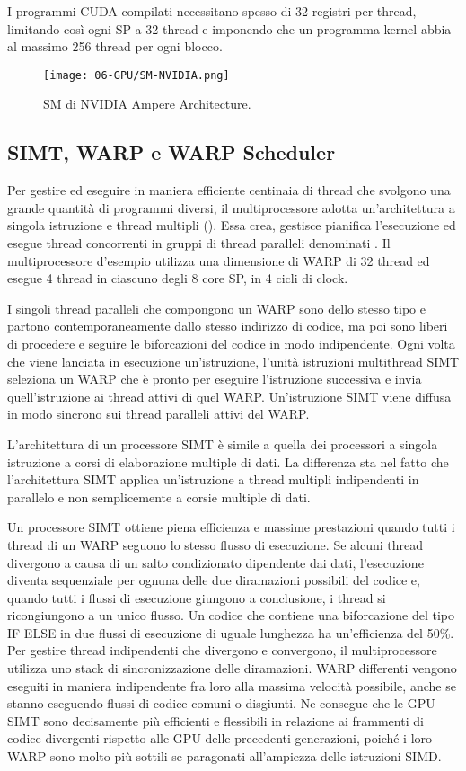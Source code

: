 I programmi CUDA compilati necessitano spesso di 32 registri per thread, limitando così ogni SP a 32 thread e imponendo che un programma kernel abbia al massimo 256 thread per ogni blocco.

\begin{figure}[h]
    \centering
    \texttt{[image: 06-GPU/SM-NVIDIA.png]}
    \caption{SM di NVIDIA Ampere Architecture.}
\end{figure}

\subsection{SIMT, WARP e WARP Scheduler}

Per gestire ed eseguire in maniera efficiente centinaia di thread che svolgono una grande quantità di programmi diversi, il multiprocessore adotta un'architettura a singola istruzione e thread multipli (). Essa crea, gestisce pianifica l'esecuzione ed esegue thread concorrenti in gruppi di thread paralleli denominati . Il multiprocessore d'esempio utilizza una dimensione di WARP di  32 thread ed esegue 4 thread in ciascuno degli 8 core SP, in 4 cicli di clock. 

I singoli thread paralleli che compongono un WARP sono dello stesso tipo e partono contemporaneamente dallo stesso indirizzo di codice, ma poi sono liberi di procedere e seguire le biforcazioni del codice in modo indipendente. Ogni volta che viene lanciata in esecuzione un'istruzione, l'unità istruzioni multithread SIMT seleziona un WARP che è pronto per eseguire l'istruzione successiva e invia quell'istruzione ai thread attivi di quel WARP. Un'istruzione SIMT viene diffusa in modo sincrono sui thread paralleli attivi del WARP. 

L'architettura di un processore SIMT è simile a quella dei processori a singola istruzione a corsi di elaborazione multiple di dati. La differenza sta nel fatto che l'architettura SIMT applica un'istruzione a thread multipli indipendenti in parallelo e non semplicemente a corsie multiple di dati. 

Un processore SIMT ottiene piena efficienza e massime prestazioni quando tutti i thread di un WARP seguono lo stesso flusso di esecuzione. Se alcuni thread divergono a causa di un salto condizionato dipendente dai dati, l'esecuzione diventa sequenziale per ognuna delle due diramazioni possibili del codice e, quando tutti i flussi di esecuzione giungono a conclusione, i thread si ricongiungono a un unico flusso. Un codice che contiene una biforcazione del tipo IF ELSE in due flussi di esecuzione di uguale lunghezza ha un'efficienza del 50\%. Per gestire thread indipendenti che divergono e convergono, il multiprocessore utilizza uno stack di sincronizzazione delle diramazioni. WARP differenti vengono eseguiti in maniera indipendente fra loro alla massima velocità possibile, anche se stanno eseguendo flussi di codice comuni o disgiunti. Ne consegue che le GPU SIMT sono decisamente più efficienti e flessibili in relazione ai frammenti di codice divergenti rispetto alle GPU delle precedenti generazioni, poiché i loro WARP sono molto più sottili se paragonati all'ampiezza delle istruzioni SIMD.

